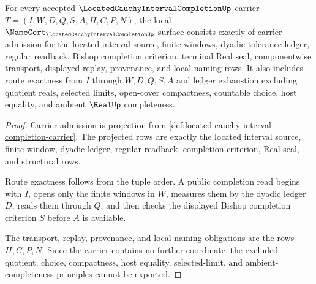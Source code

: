 \begin{theorem}
\label{thm:located-cauchy-interval-completion-namecert-obligations}
For every accepted $\LocatedCauchyIntervalCompletionUp$ carrier $T=(I,W,D,Q,S,A,H,C,P,N)$, the local $\NameCert_{\LocatedCauchyIntervalCompletionUp}$ surface consists exactly of carrier admission for the located interval source, finite windows, dyadic tolerance ledger, regular readback, Bishop completion criterion, terminal Real seal, componentwise transport, displayed replay, provenance, and local naming rows. It also includes route exactness from $I$ through $W,D,Q,S,A$ and ledger exhaustion excluding quotient reals, selected limits, open-cover compactness, countable choice, host equality, and ambient $\RealUp$ completeness.
\end{theorem}
\begin{proof}
Carrier admission is projection from \autoref{def:located-cauchy-interval-completion-carrier}. The projected rows are exactly the located interval source, finite window, dyadic ledger, regular readback, completion criterion, Real seal, and structural rows.

Route exactness follows from the tuple order. A public completion read begins with $I$, opens only the finite windows in $W$, measures them by the dyadic ledger $D$, reads them through $Q$, and then checks the displayed Bishop completion criterion $S$ before $A$ is available.

The transport, replay, provenance, and local naming obligations are the rows $H,C,P,N$. Since the carrier contains no further coordinate, the excluded quotient, choice, compactness, host equality, selected-limit, and ambient-completeness principles cannot be exported.
\end{proof}

